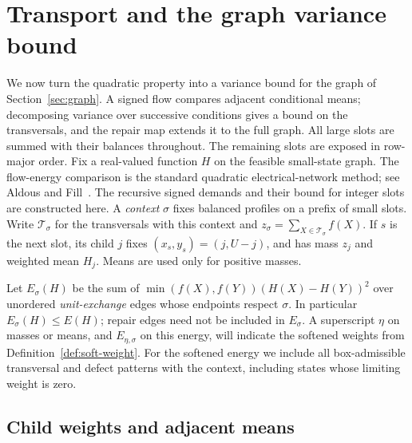 \section{Transport and the graph variance bound}\label{sec:transport}

We now turn the quadratic property into a variance bound for the graph of
Section~\ref{sec:graph}. A signed flow compares adjacent conditional means;
decomposing variance over successive conditions gives a bound on the
transversals, and the repair map extends it to the full graph. All large
slots are summed with their balances throughout. The remaining slots are
exposed in row-major order. Fix a real-valued function $H$ on the feasible
small-state graph.
The flow-energy comparison is the standard quadratic electrical-network
method; see Aldous and Fill~\cite[Section~3.7.1]{AF2002}. The recursive
signed demands and their bound for integer slots are constructed here.
A \emph{context} $\sigma$ fixes balanced profiles on a prefix of small slots.
Write $\mathcal T_\sigma$ for the transversals with this context and
$z_\sigma=\sum_{X\in\mathcal T_\sigma}f(X)$.  If $s$ is the next slot,
its child $j$ fixes $(x_s,y_s)=(j,U-j)$, and has mass $z_j$ and weighted
mean $H_j$.  Means are used only for positive masses.

Let $E_\sigma(H)$ be the sum of
$\min(f(X),f(Y))(H(X)-H(Y))^2$ over unordered \emph{unit-exchange} edges
whose endpoints respect $\sigma$.  In particular $E_\sigma(H)\le E(H)$;
repair edges need not be included in $E_\sigma$.  A superscript $\eta$ on
masses or means, and $E_{\eta,\sigma}$ on this energy, will indicate the
softened weights from Definition~\ref{def:soft-weight}.  For the softened
energy we include all box-admissible transversal and defect patterns with
the context, including states whose limiting weight is zero.

\subsection{Child weights and adjacent means}

